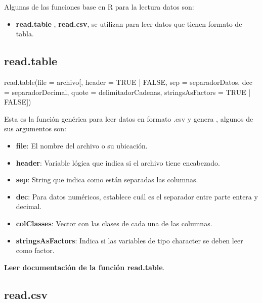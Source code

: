 \documentclass[
  12pt,
]{book}
\newenvironment{Shaded}{\begin{snugshade}}{\end{snugshade}}
\newcommand{\AttributeTok}[1]{\textcolor[rgb]{0.77,0.63,0.00}{#1}}
\newcommand{\ConstantTok}[1]{\textcolor[rgb]{0.00,0.00,0.00}{#1}}
\newcommand{\FunctionTok}[1]{\textcolor[rgb]{0.00,0.00,0.00}{#1}}
\newcommand{\NormalTok}[1]{#1}
\newcommand{\SpecialCharTok}[1]{\textcolor[rgb]{0.00,0.00,0.00}{#1}}
\providecommand{\tightlist}{%
  \setlength{\itemsep}{0pt}\setlength{\parskip}{0pt}}
\begin{document}
Algunas de las funciones base en R para la lectura datos son:

\begin{itemize}
\tightlist
\item
  \textbf{read.table} , \textbf{read.csv}, se utilizan para leer datos que tienen formato de tabla.
\end{itemize}

\hypertarget{read.table}{%
\subsection{\texorpdfstring{\textbf{read.table}}{read.table}}\label{read.table}}

\begin{Shaded}
\begin{Highlighting}[]
\FunctionTok{read.table}\NormalTok{(}\AttributeTok{file =}\NormalTok{ archivo[, }\AttributeTok{header =} \ConstantTok{TRUE} \SpecialCharTok{|} \ConstantTok{FALSE}\NormalTok{,}
  \AttributeTok{sep =}\NormalTok{ separadorDatos, }\AttributeTok{dec =}\NormalTok{ separadorDecimal,}
  \AttributeTok{quote =}\NormalTok{ delimitadorCadenas,}
  \AttributeTok{stringsAsFactors =} \ConstantTok{TRUE} \SpecialCharTok{|} \ConstantTok{FALSE}\NormalTok{])}
\end{Highlighting}
\end{Shaded}

Esta es la función genérica para leer datos en formato .csv y genera , algunos de sus argumentos son:

\begin{itemize}
\tightlist
\item
  \textbf{file}: El nombre del archivo o su ubicación.
\item
  \textbf{header}: Variable lógica que indica si el archivo tiene encabezado.
\item
  \textbf{sep}: String que indica como están separadas las columnas.
\item
  \textbf{dec}: Para datos numéricos, establece cuál es el separador entre parte entera
  y decimal.
\item
  \textbf{colClasses}: Vector con las clases de cada una de las columnas.
\item
  \textbf{stringsAsFactors}: Indica si las variables de tipo character se deben leer como factor.
\end{itemize}

\textbf{Leer documentación de la función read.table}.

\hypertarget{read.csv}{%
\subsection{\texorpdfstring{\textbf{read.csv}}{read.csv}}\label{read.csv}}
\end{document}
